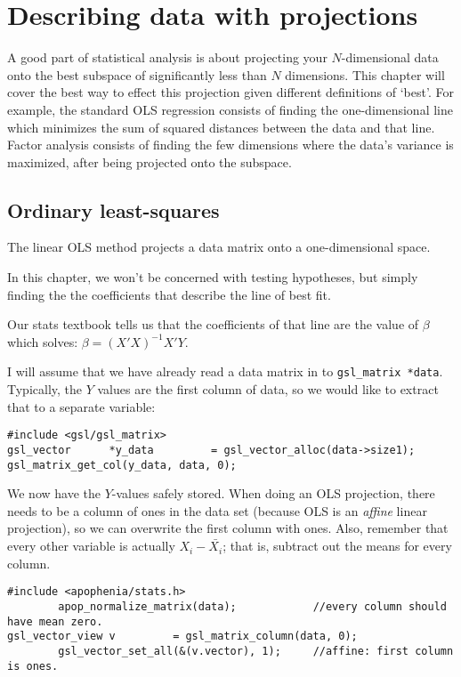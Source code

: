 \chapter{Describing data with projections} \label{projections}

A good part of statistical analysis is about projecting your
$N$-dimensional data onto the best subspace of significantly less than
$N$ dimensions. This chapter will cover the best way to effect this projection
given different definitions of `best'.
 For example, the standard OLS regression consists of
finding the one-dimensional line which minimizes the sum of squared
distances between the data and that line. Factor analysis consists
of finding the few dimensions where the data's variance is maximized, after being
projected onto the subspace.

\section{Ordinary least-squares} The linear OLS method
projects a data matrix onto a one-dimensional space. 



In this chapter, we won't be concerned with testing hypotheses, but simply finding the 
the coefficients that describe the line of best fit.

Our stats textbook tells us that the coefficients of  that line are the value of $\beta$ which solves:
$ \beta = (X'X)^{-1}X'Y$.

I will assume that we have already read a data matrix in to {\tt gsl\_matrix *data}. Typically, the $Y$
values are the first column of data, so we would like to extract that to a separate variable:
\begin{verbatim}
#include <gsl/gsl_matrix>
gsl_vector      *y_data         = gsl_vector_alloc(data->size1);
gsl_matrix_get_col(y_data, data, 0);
\end{verbatim}


We now have the $Y$-values safely stored.  When doing an OLS projection, there needs to be a column of
ones in the data set (because OLS is an {\sl affine} linear projection), so we can overwrite the first
column with ones. Also, remember that every other variable is actually
$X_i - \bar{X_i}$; that is, subtract out the means for every column.
\begin{verbatim}
#include <apophenia/stats.h>
        apop_normalize_matrix(data);            //every column should have mean zero.
gsl_vector_view v         = gsl_matrix_column(data, 0);
        gsl_vector_set_all(&(v.vector), 1);     //affine: first column is ones.
\end{verbatim}




